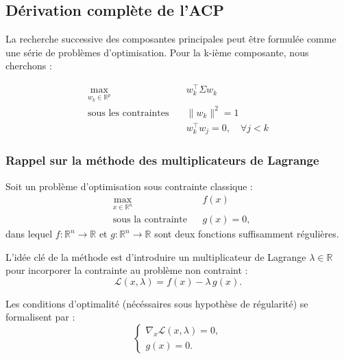 \documentclass[a4paper,12pt]{report}
\begin{document}
\subsection{Dérivation complète de l'ACP}

La recherche successive des composantes principales peut être formulée comme une série de problèmes d'optimisation. Pour la k-ième composante, nous cherchons :

\begin{equation}
\begin{aligned}
\max_{w_k \in \mathbb{R}^p} \quad & w_k^\top \Sigma w_k \\
\text{sous les contraintes} \quad & \|w_k\|^2 = 1 \\
& w_k^\top w_j = 0, \quad \forall j < k
\end{aligned}
\end{equation}

\subsubsection*{Rappel sur la méthode des multiplicateurs de Lagrange}
Soit un problème d'optimisation sous contrainte classique :
\begin{equation}
    \begin{aligned}
        & \max_{x \in \mathbb{R}^n} && f(x) \\
        & \text{sous la contrainte} && g(x) = 0,
    \end{aligned}
\end{equation}
dans lequel $f : \mathbb{R}^n \to \mathbb{R}$ et $g : \mathbb{R}^n \to \mathbb{R}$ sont deux fonctions suffisamment régulières. 

L'idée clé de la méthode est d'introduire un multiplicateur de Lagrange $\lambda \in \mathbb{R}$ pour incorporer la contrainte au problème non contraint :
\begin{equation}
    \mathcal{L}(x,\lambda) = f(x) - \lambda\, g(x).
\end{equation}

Les conditions d'optimalité (nécéssaires sous hypothèse de régularité) se formalisent par :
\begin{equation}
    \begin{cases}
        \nabla_x \mathcal{L}(x,\lambda) = 0,  \\
        g(x) = 0.
    \end{cases}
\end{equation}
\end{document}
